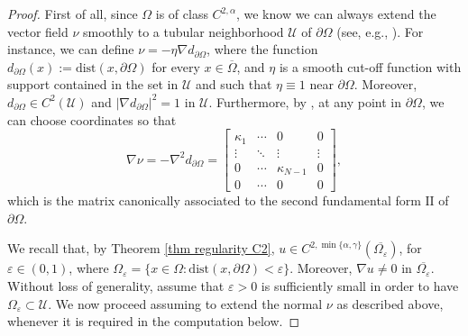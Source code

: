 \documentclass[10pt,a4paper, reqno]{amsart}
\numberwithin{equation}{section}
\begin{document}
\begin{proof}
    First of all, since $\Omega$ is of class $C^{2,\alpha}$, we know we can always extend the vector field $\nu$ smoothly to a tubular neighborhood $\mathcal{U}$ of $\partial\Omega$ (see, e.g., \cite{krpa81}). For instance, we can define $\nu = -\eta \nabla d_{\partial\Omega}$, where the function $d_{\partial\Omega}(x) := \mathrm{dist}(x,\partial\Omega)$ for every $x \in \overline{\Omega}$, and $\eta$ is a smooth cut-off function with support contained in the set in $\mathcal{U}$ and such that $\eta \equiv 1$ near $\partial\Omega$. Moreover, $d_{\partial\Omega} \in C^2(\mathcal{U})$ and $|\nabla d_{\partial\Omega}|^2 = 1$ in $\mathcal{U}$. Furthermore, by \cite[Appendix 14.6]{gitr83}, at any point in $\partial\Omega$, we can choose coordinates so that
    \begin{equation*}
        \nabla \nu = - \nabla^2 d_{\partial\Omega} = 
        \left[\begin{matrix}
        \kappa_1  &\cdots &0 &0 \\
        \vdots &\ddots &\vdots  &\vdots \\
        0  &\cdots &\kappa_{N-1} &0 \\
        0  &\cdots &0 &0
        \end{matrix}
        \right],
    \end{equation*}
    which is the matrix canonically associated to the second fundamental form $\mathrm{I\!I}$ of $\partial\Omega$.

    We recall that, by Theorem \ref{thm regularity C2}, $u \in C^{2,\min\{\alpha,\gamma\}}(\overline{\Omega_\varepsilon})$, for $\varepsilon \in (0,1)$, where $\Omega_\varepsilon=\{x\in\Omega: \mathrm{dist}(x,\partial\Omega)<\varepsilon\}$. Moreover, $\nabla u \neq 0$ in $\overline{\Omega_\varepsilon}$. Without loss of generality, assume that $\varepsilon > 0 $ is sufficiently small in order to have $\Omega_\varepsilon \subset \mathcal{U}$.
    We now proceed assuming to extend the normal $\nu$ as described above, whenever it is required in the computation below.


\end{proof}
\end{document}
